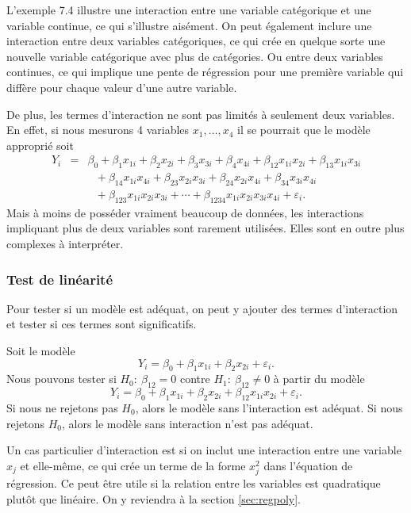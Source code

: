 L'exemple 7.4 illustre une interaction entre une variable catégorique et une variable continue, ce qui s'illustre aisément. On peut également inclure une interaction entre deux variables catégoriques, ce qui crée en quelque sorte une nouvelle variable catégorique avec plus de catégories. Ou entre deux variables continues, ce qui implique une pente de régression pour une première variable qui diffère pour chaque valeur d'une autre variable.

De plus, les termes d'interaction ne sont pas limités à seulement deux variables. En effet, si nous mesurons 4 variables $x_1,\ldots,x_4$
il se pourrait que le modèle approprié soit
\begin{eqnarray*}
Y_i&=&\beta_0+\beta_1x_{1i}+\beta_2x_{2i}+\beta_3x_{3i}+\beta_4x_{4i}+
\beta_{12}x_{1i}x_{2i}+\beta_{13}x_{1i}x_{3i}\\
&\ &\ \ \ +\beta_{14}x_{1i}x_{4i}+\beta_{23}x_{2i}x_{3i}+
\beta_{24}x_{2i}x_{4i}+\beta_{34}x_{3i}x_{4i}\\
&\ &\ \ \ +\beta_{123}
x_{1i}x_{2i}x_{3i}+\cdots+\beta_{1234}x_{1i}x_{2i}x_{3i}x_{4i}
+\varepsilon_i.\end{eqnarray*} Mais à moins de posséder vraiment beaucoup
de données, les interactions impliquant plus de deux variables
sont rarement utilisées. Elles sont en outre plus complexes à interpréter.


\subsubsection*{Test de linéarité}

Pour tester si un modèle est adéquat, on peut y ajouter des
termes d'interaction et tester si ces termes sont significatifs.
\begin{exemple}
Soit le modèle
$$Y_i=\beta_0+\beta_1x_{1i}+\beta_2x_{2i}+\varepsilon_i.$$ Nous pouvons tester si
$H_0:\ \beta_{12}=0$ contre $H_1:\ \beta_{12}\neq0$ à partir du
modèle
$$Y_i=\beta_0+\beta_1x_{1i}+\beta_2x_{2i}+\beta_{12}x_{1i}x_{2i}+\varepsilon_i.$$
Si nous ne rejetons pas $H_0$, alors le modèle sans
l'interaction est adéquat. Si nous rejetons $H_0$, alors le
modèle sans interaction n'est pas adéquat.\\
\end{exemple}

\begin{remarque}
Un cas particulier d'interaction est si on inclut une interaction entre une variable $x_j$ et elle-même, ce qui crée un terme de la forme $x_j^2$ dans l'équation de régression. Ce peut être utile si la relation entre les variables est quadratique plutôt que linéaire. On y reviendra à la section \ref{sec:regpoly}.
\end{remarque} 